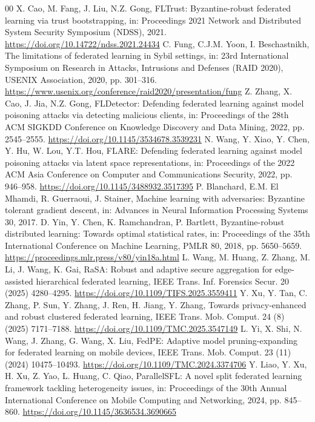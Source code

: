 \documentclass[final,5p,times,twocolumn]{elsarticle/elsarticle}
\begin{document}
\begin{thebibliography}{00}
     X. Cao, M. Fang, J. Liu, N.Z. Gong, FLTrust: Byzantine-robust federated learning via trust bootstrapping, in: Proceedings 2021 Network and Distributed System Security Symposium (NDSS), 2021. \url{https://doi.org/10.14722/ndss.2021.24434}
     C. Fung, C.J.M. Yoon, I. Beschastnikh, The limitations of federated learning in Sybil settings, in: 23rd International Symposium on Research in Attacks, Intrusions and Defenses (RAID 2020), USENIX Association, 2020, pp. 301--316. \url{https://www.usenix.org/conference/raid2020/presentation/fung}
     Z. Zhang, X. Cao, J. Jia, N.Z. Gong, FLDetector: Defending federated learning against model poisoning attacks via detecting malicious clients, in: Proceedings of the 28th ACM SIGKDD Conference on Knowledge Discovery and Data Mining, 2022, pp. 2545--2555. \url{https://doi.org/10.1145/3534678.3539231}
     N. Wang, Y. Xiao, Y. Chen, Y. Hu, W. Lou, Y.T. Hou, FLARE: Defending federated learning against model poisoning attacks via latent space representations, in: Proceedings of the 2022 ACM Asia Conference on Computer and Communications Security, 2022, pp. 946--958. \url{https://doi.org/10.1145/3488932.3517395}
     P. Blanchard, E.M. El Mhamdi, R. Guerraoui, J. Stainer, Machine learning with adversaries: Byzantine tolerant gradient descent, in: Advances in Neural Information Processing Systems 30, 2017.
     D. Yin, Y. Chen, K. Ramchandran, P. Bartlett, Byzantine-robust distributed learning: Towards optimal statistical rates, in: Proceedings of the 35th International Conference on Machine Learning, PMLR 80, 2018, pp. 5650--5659. \url{https://proceedings.mlr.press/v80/yin18a.html}
     L. Wang, M. Huang, Z. Zhang, M. Li, J. Wang, K. Gai, RaSA: Robust and adaptive secure aggregation for edge-assisted hierarchical federated learning, IEEE Trans. Inf. Forensics Secur. 20 (2025) 4280--4295. \url{https://doi.org/10.1109/TIFS.2025.3559411}
     Y. Xu, Y. Tan, C. Zhang, P. Sun, Y. Zhang, J. Ren, H. Jiang, Y. Zhang, Towards privacy-enhanced and robust clustered federated learning, IEEE Trans. Mob. Comput. 24 (8) (2025) 7171--7188. \url{https://doi.org/10.1109/TMC.2025.3547149}
     L. Yi, X. Shi, N. Wang, J. Zhang, G. Wang, X. Liu, FedPE: Adaptive model pruning-expanding for federated learning on mobile devices, IEEE Trans. Mob. Comput. 23 (11) (2024) 10475--10493. \url{https://doi.org/10.1109/TMC.2024.3374706}
     Y. Liao, Y. Xu, H. Xu, Z. Yao, L. Huang, C. Qiao, ParallelSFL: A novel split federated learning framework tackling heterogeneity issues, in: Proceedings of the 30th Annual International Conference on Mobile Computing and Networking, 2024, pp. 845--860. \url{https://doi.org/10.1145/3636534.3690665}

\end{thebibliography}
\end{document}
